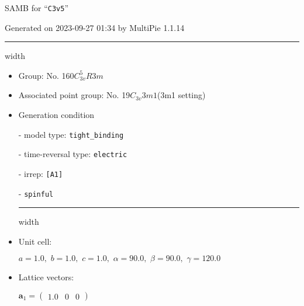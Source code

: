 \documentclass[fleqn,10pt,landscape]{article}
\begin{document}
\setcounter{MaxMatrixCols}{16}

\setlength{\baselineskip}{16pt}
\footnotesize
\begin{center}
\LARGE
SAMB for ``\texttt{C3v5}''
\end{center}
\begin{flushright}
Generated on 2023-09-27 01:34 by MultiPie 1.1.14
\end{flushright}
\vspace{1cm}


 \hfil \hrule height 1mm width \textwidth \hfil

\begin{itemize}
\item Group: No. 160\quad$C_{3v}^{5}$\quad$R3m$\quad[ trigonal ]

\item Associated point group: No. 19\quad$C_{3v}$\quad$3m1$\quad(3m1 setting)\quad[ trigonal ]

\vspace{5mm}

\item Generation condition

\quad - model type: \texttt{tight_binding}

\quad - time-reversal type: \texttt{electric}

\quad - irrep: \texttt{[A1]}

\quad - \texttt{spinful}


 \hfil \hrule height 1mm width \textwidth \hfil

\item Unit cell:

\quad $a=1.0,\,\, b=1.0,\,\, c=1.0,\,\, \alpha=90.0,\,\, \beta=90.0,\,\, \gamma=120.0$

\item Lattice vectors:

\quad $\bm{a}_1=\begin{pmatrix} 1.0 & 0 & 0 \end{pmatrix}$


\end{itemize}
\end{document}
